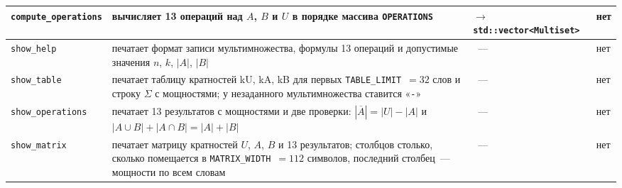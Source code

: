 \documentclass[14pt,a4paper]{extarticle}
\newcommand{\code}[1]{\texttt{#1}}
\newcommand{\us}{\_\allowbreak{}}
\begin{document}
{\begin{longtable}{|P{3.4cm}|P{5.0cm}|P{4.5cm}|P{2.5cm}|}
\code{compute\us{}operations} & вычисляет 13 операций над $A$, $B$ и $U$ в порядке массива \code{OPERATIONS} & $\to$ \code{std::vector<Multiset>} & нет \\\hline
\code{show\us{}help} & печатает формат записи мультимножества, формулы 13 операций и допустимые значения $n$, $k$, $|A|$, $|B|$ &~--- & нет \\\hline
\code{show\us{}table} & печатает таблицу кратностей kU, kA, kB для первых \code{TABLE\us{}LIMIT}~$= 32$ слов и строку $\Sigma$ с мощностями; у незаданного мультимножества ставится «\code{-}» &~--- & нет \\\hline
\code{show\us{}operations} & печатает 13 результатов с мощностями и две проверки: $|\overline{A}| = |U| - |A|$ и $|A \cup B| + |A \cap B| = |A| + |B|$ &~--- & нет \\\hline
\code{show\us{}matrix} & печатает матрицу кратностей $U$, $A$, $B$ и 13 результатов; столбцов столько, сколько помещается в \code{MATRIX\us{}WIDTH}~$= 112$ символов, последний столбец~--- мощности по всем словам &~--- & нет \\\hline
\end{longtable}

}
\end{document}

